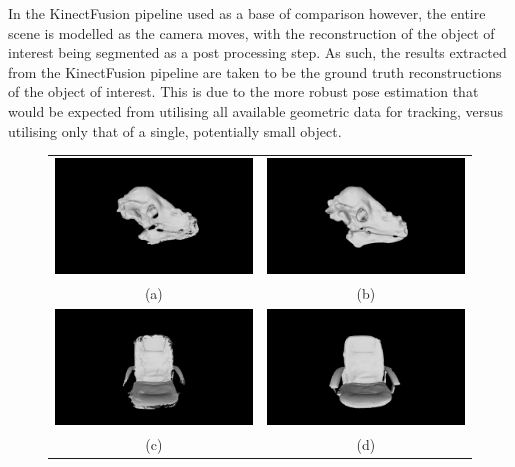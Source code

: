 In the KinectFusion pipeline used as a base of comparison however, the entire scene is modelled 
as the camera moves, with the reconstruction of the object of interest being segmented as a post 
processing step. As such, the results extracted from the KinectFusion pipeline are taken to be the 
ground truth reconstructions of the object of interest. This is due to the more robust 
pose estimation that would be expected from utilising all available geometric data 
for tracking, versus utilising only that of a single, potentially small object.

\begin{figure}[!htbp]
  \centering
  \begin{tabular}{cc}
    \includegraphics[width=.4\linewidth]{figures/object_recon/comp/prob/dino00.png}&
    \includegraphics[width=.4\linewidth]{figures/object_recon/comp/itm/dino00.png}\\
    (a) & (b)\\
		\includegraphics[width=.4\linewidth]{figures/object_recon/comp/prob/chair00.png}&
    \includegraphics[width=.4\linewidth]{figures/object_recon/comp/itm/chair00.png} \\
    (c) & (d) \\

\end{tabular}
\end{figure}
